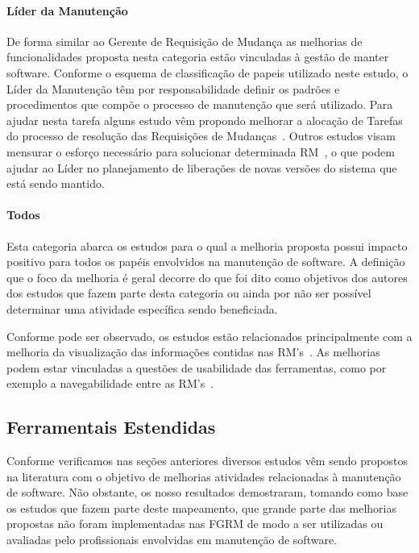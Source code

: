 \paragraph{Líder da Manutenção} De forma similar ao Gerente de Requisição de
Mudança as melhorias de funcionalidades proposta nesta categoria estão
vinculadas à gestão de manter software. Conforme o esquema de  classificação de
papeis utilizado neste estudo, o Líder da Manutenção têm por responsabilidade
definir os padrões e procedimentos que compõe o processo de manutenção que será
utilizado. Para ajudar nesta tarefa alguns estudo  vêm propondo melhorar a
alocação de Tarefas do processo de resolução das Requisições de
Mudanças~\cite{netto2010automated}.  Outros estudos visam mensurar o esforço
necessário para solucionar determinada RM~\cite{Vijayakumar2014, Nagwani2010}, o
que podem ajudar ao Líder no planejamento de liberações de novas versões do
sistema que está sendo mantido. 

\paragraph{Todos} Esta categoria abarca os estudos para o qual a melhoria
proposta possui impacto positivo para todos os papéis envolvidos na manutenção
de software. A definição que o foco da melhoria é geral decorre do que foi dito
como objetivos dos autores dos estudos que fazem parte desta categoria ou ainda
por não ser possível determinar uma atividade específica sendo beneficiada.

Conforme pode ser observado, os estudos estão relacionados principalmente com a
melhoria da  visualização das informações contidas nas RM's~\cite{hora2012bug,
	takama2013application, dal2014bug}. As melhorias podem estar vinculadas a
questões de usabilidade das ferramentas, como por exemplo a navegabilidade entre
as RM's~\cite{dal2014bug}. 

\subsection{Ferramentais Estendidas} \label{sub:ferrramentas_extendidas}

Conforme verificamos nas seções anteriores diversos estudos vêm sendo propostos
na literatura com o objetivo de melhorias atividades relacionadas à manutenção
de software. Não obstante, os nosso resultados demostraram, tomando como base os
estudos que fazem parte deste mapeamento, que grande parte das melhorias
propostas não foram implementadas nas FGRM de modo a ser utilizadas ou avaliadas
pelo profissionais envolvidas em manutenção de software.

